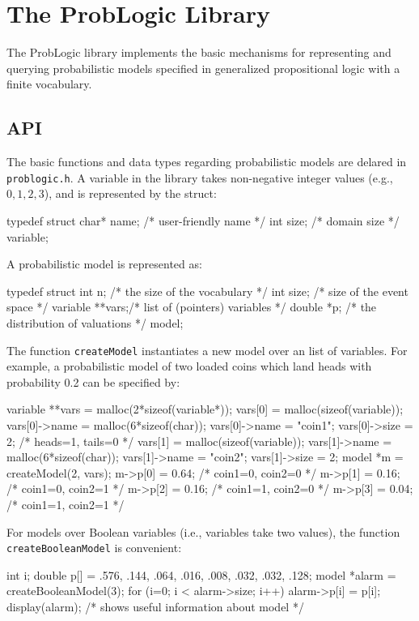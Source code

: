 \documentclass{amsart}
\begin{document}
\section{The ProbLogic Library}

The ProbLogic library implements the basic mechanisms for representing
and querying probabilistic models specified in generalized propositional
logic with a finite vocabulary.

\subsection{API}

The basic functions and data types regarding probabilistic models are
delared in \verb|problogic.h|. A variable in the library takes
non-negative integer values (e.g., $0,1,2,3$), and is represented by the
struct:
\begin{code}
typedef struct {
  char* name; /* user-friendly name */
  int size;   /* domain size */
} variable;
\end{code}

A probabilistic model is represented as:
\begin{code}
typedef struct {
  int n;          /* the size of the vocabulary */
  int size;       /* size of the event space */
  variable **vars;/* list of (pointers) variables */
  double *p;      /* the distribution of valuations */
} model;
\end{code}

The function \verb|createModel| instantiates a new model over an list of
variables. For example, a probabilistic model of two loaded coins which
land heads with probability 0.2 can be specified by:
\begin{code}
variable **vars = malloc(2*sizeof(variable*));
vars[0] = malloc(sizeof(variable));
vars[0]->name = malloc(6*sizeof(char));
vars[0]->name = "coin1";
vars[0]->size = 2; /* heads=1, tails=0 */
vars[1] = malloc(sizeof(variable));
vars[1]->name = malloc(6*sizeof(char));
vars[1]->name = "coin2";
vars[1]->size = 2;
model *m = createModel(2, vars);
m->p[0] = 0.64; /* coin1=0, coin2=0 */
m->p[1] = 0.16; /* coin1=0, coin2=1 */
m->p[2] = 0.16; /* coin1=1, coin2=0 */
m->p[3] = 0.04; /* coin1=1, coin2=1 */
\end{code}

For models over Boolean variables (i.e., variables take two values), the function \verb|createBooleanModel| is convenient:
\begin{code}
  int i;
  double p[] = {.576, .144, .064, .016, .008, .032, .032, .128};
  model *alarm = createBooleanModel(3);
  for (i=0; i < alarm->size; i++) alarm->p[i] = p[i]; 
  display(alarm);  /* shows useful information about model */
\end{code}
\end{document}
